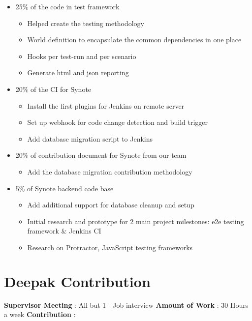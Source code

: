 \begin{itemize}
	\item 25\% of the code in test framework
		\begin{itemize}
			\item Helped create the testing methodology
			\item World definition to encapsulate the common dependencies in one place
			\item Hooks per test-run and per scenario
			\item Generate html and json reporting
		\end{itemize}
	\item 20\% of the CI for Synote
		\begin{itemize}
			\item Install the first plugins for Jenkins on remote server
			\item Set up webhook for code change detection and build trigger
			\item Add database migration script to Jenkins
		\end{itemize}
	\item 20\% of contribution document for Synote from our team
		\begin{itemize}
			\item Add the database migration contribution methodology
		\end{itemize}
	\item 5\% of Synote backend code base
		\begin{itemize}
			\item Add additional support for database cleanup and setup
			\item Initial research and prototype for 2 main project milestones: e2e testing framework \& Jenkins CI
			\item Research on Protractor, JavaScript testing frameworks
		\end{itemize}
\end{itemize}

\section{Deepak Contribution}
\label{sec:deepak-contribution}
\textbf{Supervisor Meeting} : All but 1 - Job interview
\newline
\textbf{Amount of Work} : 30 Hours a week
\newline
\textbf{Contribution} :

